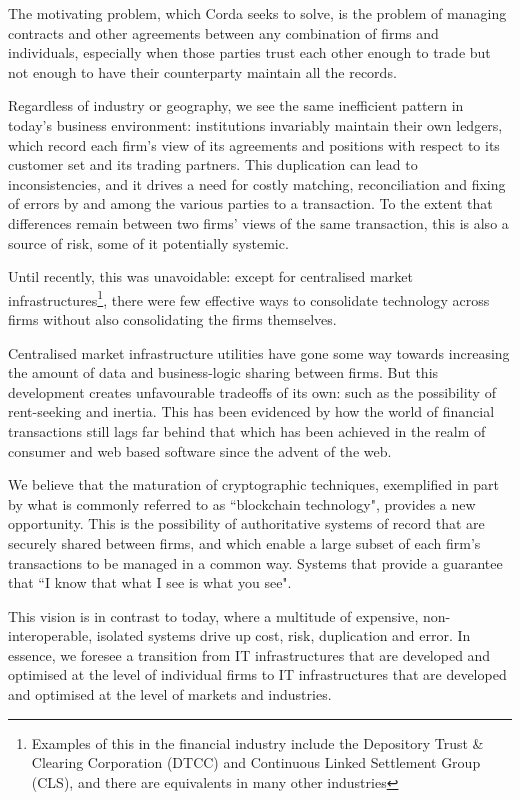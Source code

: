 \documentclass{article}
\begin{document}
The motivating problem, which Corda seeks to solve, is the problem of managing contracts and other agreements between any combination of firms and individuals, especially when those parties trust each other enough to trade but not enough to have their counterparty maintain all the records.

Regardless of industry or geography, we see the same inefficient pattern in today's business environment: institutions invariably maintain their own ledgers, which record each firm's view of its agreements and positions with respect to its customer set and its trading partners. This duplication can lead to inconsistencies, and it drives a need for costly matching, reconciliation and fixing of errors by and among the various parties to a transaction. To the extent that differences remain between two firms' views of the same transaction, this is also a source of risk, some of it potentially systemic.

Until recently, this was unavoidable: except for centralised market infrastructures\footnote{Examples of this in the financial industry include the Depository Trust \& Clearing Corporation (DTCC) and Continuous Linked Settlement Group (CLS), and there are equivalents in many other industries}, there were few effective ways to consolidate technology across firms without also consolidating the firms themselves.

Centralised market infrastructure utilities have gone some way towards increasing the amount of data and business-logic sharing between firms. But this development creates unfavourable tradeoffs of its own: such as the possibility of rent-seeking and inertia. This has been evidenced by how the world of financial transactions still lags far behind that which has been achieved in the realm of consumer and web based software since the advent of the web\cite{IT}.

We believe that the maturation of cryptographic techniques, exemplified in part by what is commonly referred to as ``blockchain technology", provides a new opportunity. This is the possibility of authoritative systems of record that are securely shared between firms, and which enable a large subset of each firm's transactions to be managed in a common way. Systems that provide a guarantee that ``I know that what I see is what you see".

This vision is in contrast to today, where a multitude of expensive, non-interoperable, isolated systems drive up cost, risk, duplication and error. In essence, we foresee a transition from IT infrastructures that are developed and optimised at the level of individual firms to IT infrastructures that are developed and optimised at the level of markets and industries.
\end{document}
